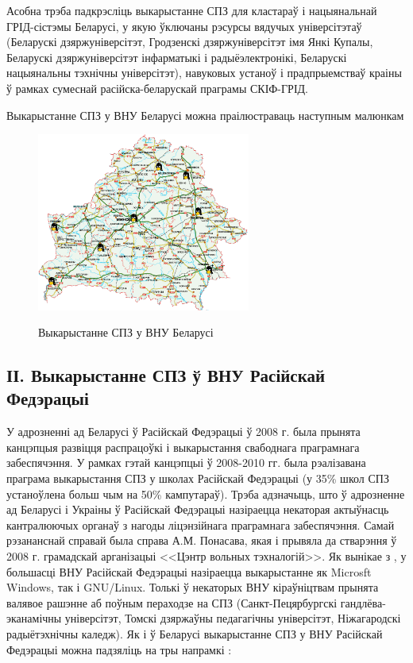 \documentclass[10pt, a5paper]{article}
\begin{document}
Асобна трэба падкрэсліць выкарыстанне СПЗ для кластараў і нацыянальнай
ГРІД-сістэмы Беларусі, у якую ўключаны рэсурсы вядучых універсітэтаў (Беларускі
дзяржуніверсітэт, Гродзенскі дзяржуніверсітэт імя Янкі Купалы, Беларускі
дзяржуніверсітэт інфарматыкі і радыёэлектронікі, Беларускі нацыянальны
тэхнічны універсітэт), навуковых устаноў і прадпрыемстваў краіны ў рамках
сумеснай расійска-беларускай праграмы СКІФ-ГРІД.

Выкарыстанне СПЗ у ВНУ Беларусі можна праілюстраваць наступным малюнкам

\begin{figure}[htpb]
  \centering
  \includegraphics[width=7cm]{03_2012_bilorus}
  \label{fig:Zlobin1}
  \caption{Выкарыстанне СПЗ у ВНУ Беларусі}
\end{figure}


\subsection*{ІІ. Выкарыстанне СПЗ ў ВНУ Расійскай Федэрацыі}

У адрозненні ад Беларусі ў Расійскай Федэрацыі ў 2008 г. была прынята канцэпцыя
развіцця распрацоўкі і выкарыстання свабоднага праграмнага забеспячэння. У
рамках гэтай канцэпцыі ў 2008-2010 гг. была рэалізавана праграма выкарыстання
СПЗ у школах Расійскай Федэрацыі (у 35\% школ СПЗ устаноўлена больш чым на
50\% кампутараў). Трэба адзначыць, што ў адрозненне ад Беларусі і Украіны ў
Расійскай Федэрацыі назіраецца некаторая актыўнасць кантралюючых органаў з
нагоды ліцэнзійнага праграмнага забеспячэння. Самай рэзананснай справай была
справа А.М. Понасава, якая і прывяла да стварэння ў 2008 г. грамадскай арганізацыі
<<Цэнтр вольных тэхналогій>>. Як вынікае з  \cite{Zlobin1, Zlobin2, Zlobin3}, у большасці ВНУ
Расійскай Федэрацыі назіраецца выкарыстанне як Microsft Windows, так і GNU/Linux. Толькі
ў некаторых ВНУ кіраўніцтвам прынята валявое рашэнне аб поўным пераходзе на
СПЗ (Санкт-Пецярбургскі гандлёва-эканамічны універсітэт, Томскі дзяржаўны
педагагічны універсітэт, Ніжагародскі радыётэхнічны каледж). Як і ў Беларусі
выкарыстанне СПЗ у ВНУ Расійскай Федэрацыі можна падзяліць на тры напрамкі
\cite{Zlobin3, Zlobin4, Zlobin5}:
\end{document}
